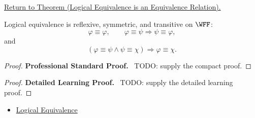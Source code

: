 \newpage
{}
\label{prf:logical-equivalence-equivalence-relation}

\begin{remark*}[Return]
\hyperref[thm:logical-equivalence-equivalence-relation]{Return to Theorem (Logical Equivalence is an Equivalence Relation).}
\end{remark*}

\begin{theorem*}
Logical equivalence is reflexive, symmetric, and transitive on \(\WFF\):
\[
\varphi\equiv\varphi,
\qquad
\varphi\equiv\psi\Longrightarrow\psi\equiv\varphi,
\]
and
\[
(\varphi\equiv\psi\land\psi\equiv\chi)
\Longrightarrow
\varphi\equiv\chi.
\]
\end{theorem*}

\begin{proof}
\textbf{Professional Standard Proof.}~
TODO: supply the compact proof.
\end{proof}

\begin{proof}
\textbf{Detailed Learning Proof.}~
TODO: supply the detailed learning proof.
\end{proof}

\begin{remark*}
\end{remark*}

\begin{dependencies}
\begin{itemize}
  \item \hyperref[def:logical-equivalence-propositional-logic]{Logical Equivalence}
\end{itemize}
\end{dependencies}

\clearpage
